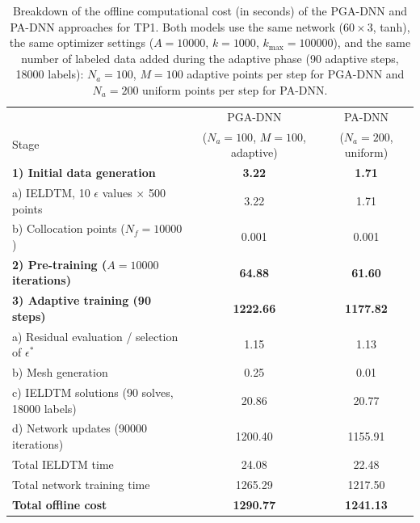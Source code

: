 \begin{table}[ht]
\centering
\caption{Breakdown of the offline computational cost (in seconds) of the PGA-DNN and PA-DNN approaches for TP1.
Both models use the same network ($60\times3$, tanh), the same optimizer settings ($A = 10000$, $k = 1000$,
$k_{\max} = 100000$), and the same number of labeled data added during the adaptive phase (90 adaptive steps,
18000 labels): $N_a = 100$, $M = 100$ adaptive points per step for PGA-DNN and $N_a = 200$ uniform points per
step for PA-DNN.}
\label{tab:cost_tp1}
\begin{tabular}{lcc}
\hline
 & PGA-DNN & PA-DNN \\
Stage & ($N_a = 100$, $M = 100$, adaptive) & ($N_a = 200$, uniform) \\
\hline
\textbf{1) Initial data generation} & \textbf{3.22} & \textbf{1.71} \\
\quad a) IELDTM, 10 $\epsilon$ values $\times$ 500 points & 3.22 & 1.71 \\
\quad b) Collocation points ($N_f = 10000$) & 0.001 & 0.001 \\
\textbf{2) Pre-training ($A = 10000$ iterations)} & \textbf{64.88} & \textbf{61.60} \\
\textbf{3) Adaptive training (90 steps)} & \textbf{1222.66} & \textbf{1177.82} \\
\quad a) Residual evaluation / selection of $\epsilon^*$ & 1.15 & 1.13 \\
\quad b) Mesh generation & 0.25 & 0.01 \\
\quad c) IELDTM solutions (90 solves, 18000 labels) & 20.86 & 20.77 \\
\quad d) Network updates (90000 iterations) & 1200.40 & 1155.91 \\
\hline
Total IELDTM time & 24.08 & 22.48 \\
Total network training time & 1265.29 & 1217.50 \\
\textbf{Total offline cost} & \textbf{1290.77} & \textbf{1241.13} \\
\hline
\end{tabular}
\end{table}
